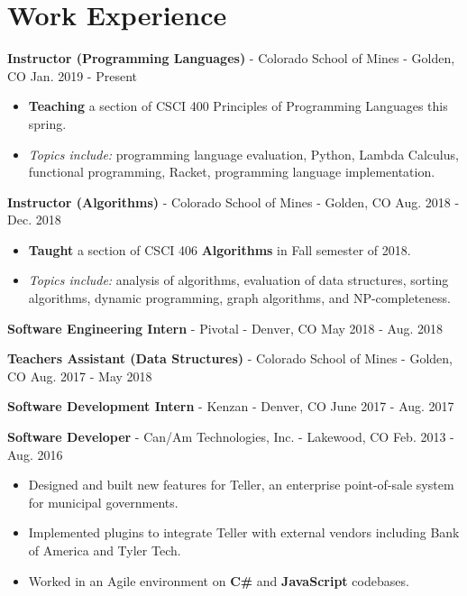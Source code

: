 \documentclass[10pt,letterpaper]{article}
\begin{document}
\section*{Work Experience}
\textbf{Instructor (Programming Languages)} - Colorado School of Mines - Golden, CO
\hfill Jan. 2019 - Present
\begin{itemize}
    \item \textbf{Teaching} a section of CSCI 400 Principles of Programming
        Languages this spring.
    \item \textit{Topics include:} programming language evaluation, Python,
        Lambda Calculus, functional programming, Racket, programming language
        implementation.
\end{itemize}

\textbf{Instructor (Algorithms)} - Colorado School of Mines - Golden, CO
\hfill Aug. 2018 - Dec. 2018
\begin{itemize}
    \item \textbf{Taught} a section of CSCI 406 \textbf{Algorithms} in Fall
        semester of 2018.
    \item \textit{Topics include:} analysis of algorithms, evaluation of data
        structures, sorting algorithms, dynamic programming, graph algorithms,
        and NP-completeness.
\end{itemize}

\textbf{Software Engineering Intern} - Pivotal - Denver, CO
\hfill May 2018 - Aug. 2018

\vspace{2pt}
\textbf{Teachers Assistant (Data Structures)} - Colorado School of Mines -
Golden, CO \hfill Aug. 2017 - May 2018

\vspace{2pt}
\textbf{Software Development Intern} - Kenzan - Denver, CO
\hfill June 2017 - Aug. 2017

\vspace{2pt}
\textbf{Software Developer} - Can/Am Technologies, Inc. - Lakewood, CO
\hfill Feb. 2013 - Aug. 2016
\begin{itemize}
    \item Designed and built new features for Teller, an enterprise
        point-of-sale system for municipal governments.
    \item Implemented plugins to integrate Teller with external vendors
        including Bank of America and Tyler Tech.
    \item Worked in an Agile environment on \textbf{C\#} and \textbf{JavaScript}
        codebases.
\end{itemize}
\end{document}
